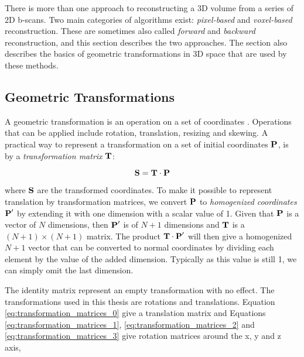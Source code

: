 There is more than one approach to reconstructing a 3D volume from a series of 2D b-scans. Two main categories of algorithms exist: \emph{pixel-based} and \emph{voxel-based} reconstruction. These are sometimes also called \emph{forward} and \emph{backward} reconstruction, and this section describes the two approaches.
The section also describes the basics of geometric transformations in 3D space that are used by these methods.

\subsection{Geometric Transformations}

	A geometric transformation is an operation on a set of coordinates \cite{eberly2004}. Operations that can be applied include rotation, translation, resizing and skewing. A practical way to represent a transformation on a set of initial coordinates $\textbf{P}$, is by a \emph{transformation matrix} $\textbf{T}$:
	
	\begin{equation}
		\textbf{S} = \textbf{T} \cdot \textbf{P}
		\label{eq:transformation}
	\end{equation}
	
	where $\textbf{S}$ are the transformed coordinates. To make it possible to represent translation by transformation matrices, we convert $\textbf{P}$ to \emph{homogenized coordinates} $\textbf{P}'$ by extending it with one dimension with a scalar value of 1. Given that $\textbf{P}$ is a vector of $N$ dimensions, then $\textbf{P}'$ is of $N+1$ dimensions and $\textbf{T}$ is a $(N+1) \times (N+1)$ matrix. The product $\textbf{T} \cdot \textbf{P}'$ will then give a homogenized $N+1$ vector that can be converted to normal coordinates by dividing each element by the value of the added dimension. Typically as this value is still 1, we can simply omit the last dimension.
	
	The identity matrix represent an empty transformation with no effect. The transformations used in this thesis are rotations and translations. Equation \ref{eq:transformation_matrices_0} give a translation matrix and Equations \ref{eq:transformation_matrices_1}, \ref{eq:transformation_matrices_2} and \ref{eq:transformation_matrices_3} give rotation matrices around the x, y and z axis, 
	
